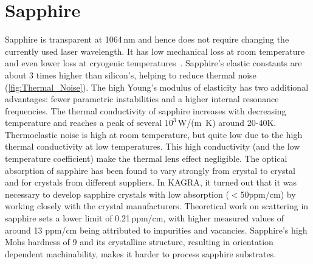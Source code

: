 \section{Sapphire}
Sapphire is transparent at 1064\,nm and hence does not require changing the currently used laser wavelength. It has low mechanical loss at room temperature~\cite{Rowan_2000a} and even lower loss at cryogenic temperatures~\cite{uchiyama1999mechanical}. 
Sapphire's elastic constants are about 3 times higher than silicon's, helping to reduce thermal noise (\ref{fig:Thermal_Noise}). The high Young's modulus of elasticity has two additional advantages: fewer parametric instabilities and a higher internal resonance frequencies. The thermal conductivity of sapphire increases with decreasing temperature and reaches a peak of several $10^3$\,W/(m \,K) around 20-40K. Thermoelastic noise is high at room temperature, but quite low due to the high thermal conductivity at low temperatures. This high conductivity (and the low temperature coefficient) make the thermal lens effect negligible. 
The optical absorption of sapphire has been found to vary strongly from crystal to crystal and for crystals from different suppliers. %
In \ac{KAGRA}, it turned out that it was necessary to develop sapphire crystals with low absorption ($<$50ppm/cm) by working closely with the crystal manufacturers. 
Theoretical work on scattering in sapphire sets a lower limit of 0.21\,ppm/cm, with higher measured values of around 13 ppm/cm being attributed to impurities and vacancies.
Sapphire's high Mohs hardness of 9 and its crystalline structure, resulting in orientation dependent machinability, makes it harder to process sapphire substrates. 
